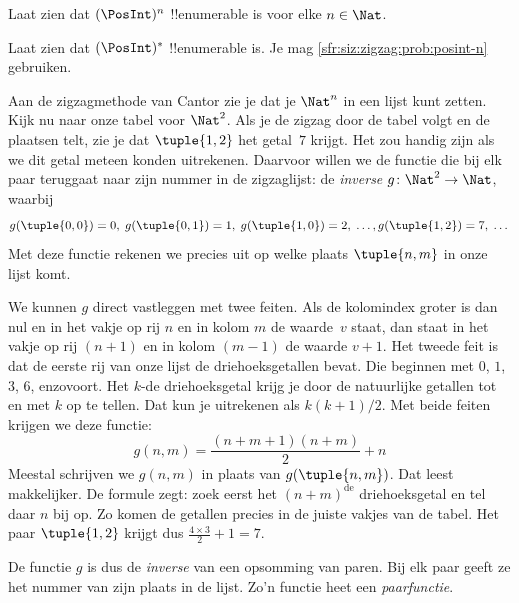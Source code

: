 \documentclass[openany]{memoir}
\begin{document}
\begin{prob}\label{sfr:siz:zigzag:prob:posint-n}
Laat zien dat $(\PosInt)^n$ !!{enumerable} is voor elke $n \in \Nat$.
\end{prob}

\begin{prob}\label{sfr:siz:zigzag:prob:posint-star}
  Laat zien dat $(\PosInt)^*$ !!{enumerable} is. Je mag
  \cref{sfr:siz:zigzag:prob:posint-n} gebruiken.
\end{prob}
\endgroup

\begingroup
\def\olfilename{OLP-0031}
\def\olfilepath{content/sets-functions-relations/size-of-sets/}
\hypertarget{unit-OLP-0031}{}




\begin{explain}
Aan de zigzagmethode van Cantor zie je dat je $\Nat^n$ in een lijst kunt zetten.
Kijk nu naar onze tabel voor $\Nat^2$. Als je de zigzag door de tabel
volgt en de plaatsen telt, zie je dat $\tuple{1,2}$ het getal~$7$
krijgt. Het zou handig zijn als we dit getal meteen konden uitrekenen.
Daarvoor willen we de functie die bij elk paar teruggaat naar zijn nummer
in de zigzaglijst: de
\emph{inverse} $g\colon \Nat^2 \to \Nat$, waarbij
\[
g(\tuple{0,0}) = 0, \;
g(\tuple{0,1}) = 1, \;
g(\tuple{1,0}) = 2, \; \dots,  
g(\tuple{1,2}) = 7, \; \dots
\]
Met deze functie rekenen we precies uit op welke plaats $\tuple{n, m}$
in onze lijst komt.

We kunnen $g$ direct vastleggen met twee feiten. Als de kolomindex
groter is dan nul en in het vakje op rij $n$ en in kolom $m$ de
waarde~$v$ staat, dan staat in het vakje op
rij $(n+1)$ en in kolom $(m-1)$ de waarde $v + 1$. Het tweede feit is
dat de eerste rij van onze lijst de driehoeksgetallen bevat. Die beginnen
met $0$, $1$, $3$, $6$, enzovoort. Het $k$-de driehoeksgetal krijg je
door de natuurlijke getallen tot en met $k$ op te tellen. Dat kun je uitrekenen
als $k(k+1)/2$. Met beide feiten krijgen we deze functie:
\[
  g(n,m) = \frac{(n+m+1)(n+m)}{2} + n
\]
Meestal schrijven we $g(n, m)$ in plaats van $g(\tuple{n, m})$. Dat
leest makkelijker. De formule zegt: zoek eerst het
$(n+m)^\text{de}$ driehoeksgetal en tel daar $n$ bij op. Zo komen de
getallen precies in de juiste vakjes van de tabel. Het paar
$\tuple{1, 2}$ krijgt dus $\frac{4 \times 3}{2} + 1 = 7$.

De functie $g$ is dus de \emph{inverse} van een opsomming van paren. Bij elk
paar geeft ze het nummer van zijn plaats in de lijst.
Zo'n functie heet een \emph{paarfunctie}.
\end{explain}
\end{document}
